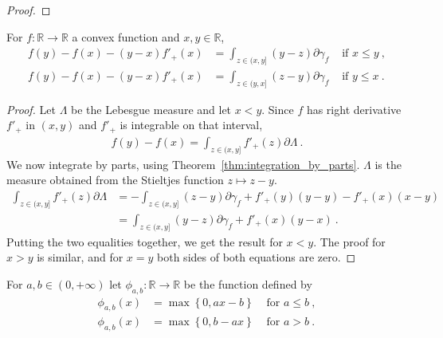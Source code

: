 \begin{proof} \notready
\uses{}

\end{proof}


\begin{lemma}
  \label{lem:convex_taylor}
  \leanok
  For $f: \mathbb{R} \to \mathbb{R}$ a convex function and $x,y \in \mathbb{R}$,
  \begin{align*}
  f(y) - f(x) - (y - x)f'_+(x) &= \int_{z \in (x,y]} (y - z) \partial \gamma_f & \text{ if } x \le y \: ,
  \\
  f(y) - f(x) - (y - x)f'_+(x) &= \int_{z \in (y,x]} (z - y) \partial \gamma_f & \text{ if } y \le x \: .
  \end{align*}
\end{lemma}

\begin{proof}\leanok
{}
Let $\Lambda$ be the Lebesgue measure and let $x < y$. Since $f$ has right derivative $f'_+$ in $(x,y)$ and $f'_+$ is integrable on that interval,
\begin{align*}
f(y) - f(x) = \int_{z \in (x, y]} f'_+(z) \partial \Lambda
\: .
\end{align*}
We now integrate by parts, using Theorem~\ref{thm:integration_by_parts}. $\Lambda$ is the measure obtained from the Stieltjes function $z \mapsto z - y$.
\begin{align*}
\int_{z \in (x, y]} f'_+(z) \partial \Lambda
&= - \int_{z \in (x,y]} (z - y)\partial \gamma_f + f'_+(y)(y - y) - f'_+(x)(x - y)
\\
&= \int_{z \in (x,y]} (y - z)\partial \gamma_f + f'_+(x)(y - x)
\: .
\end{align*}
Putting the two equalities together, we get the result for $x < y$. The proof for $x > y$ is similar, and for $x = y$ both sides of both equations are zero.
\end{proof}


\begin{definition}
  \label{def:statInfoFun}
  \leanok
  \uses{}
  For $a,b \in (0, +\infty)$ let $\phi_{a,b} : \mathbb{R} \to \mathbb{R}$ be the function defined by
  \begin{align*}
  \phi_{a,b}(x) &= \max\left\{0, a x - b \right\} & \text{ for } a \le b \: ,
  \\
  \phi_{a,b}(x) &= \max\left\{0, b - a x \right\} & \text{ for } a > b \: .
  \end{align*}
\end{definition}


